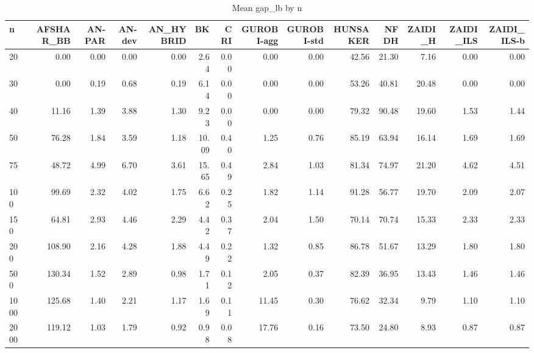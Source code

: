 \begin{table}[htbp]
\centering
\small
\caption{Mean gap\_lb by n}
\label{tab:E10a_state_of_the_art_b10_by_n}
\begin{tabular}{lrrrrrrrrrrrrr}
\toprule
n & AFSHAR\_BB & AN-PAR & AN-dev & AN\_HYBRID & BK & CRI & GUROBI-agg & GUROBI-std & HUNSAKER & NFDH & ZAIDI\_H & ZAIDI\_ILS & ZAIDI\_ILS-b \\
\midrule
20 & 0.00 & 0.00 & 0.00 & 0.00 & 2.64 & 0.00 & 0.00 & 0.00 & 42.56 & 21.30 & 7.16 & 0.00 & 0.00 \\
30 & 0.00 & 0.19 & 0.68 & 0.19 & 6.14 & 0.00 & 0.00 & 0.00 & 53.26 & 40.81 & 20.48 & 0.00 & 0.00 \\
40 & 11.16 & 1.39 & 3.88 & 1.30 & 9.23 & 0.00 & 0.00 & 0.00 & 79.32 & 90.48 & 19.60 & 1.53 & 1.44 \\
50 & 76.28 & 1.84 & 3.59 & 1.18 & 10.09 & 0.40 & 1.25 & 0.76 & 85.19 & 63.94 & 16.14 & 1.69 & 1.69 \\
75 & 48.72 & 4.99 & 6.70 & 3.61 & 15.65 & 0.49 & 2.84 & 1.03 & 81.34 & 74.97 & 21.20 & 4.62 & 4.51 \\
100 & 99.69 & 2.32 & 4.02 & 1.75 & 6.62 & 0.25 & 1.82 & 1.14 & 91.28 & 56.77 & 19.70 & 2.09 & 2.07 \\
150 & 64.81 & 2.93 & 4.46 & 2.29 & 4.42 & 0.37 & 2.04 & 1.50 & 70.14 & 70.74 & 15.33 & 2.33 & 2.33 \\
200 & 108.90 & 2.16 & 4.28 & 1.88 & 4.49 & 0.22 & 1.32 & 0.85 & 86.78 & 51.67 & 13.29 & 1.80 & 1.80 \\
500 & 130.34 & 1.52 & 2.89 & 0.98 & 1.71 & 0.12 & 2.05 & 0.37 & 82.39 & 36.95 & 13.43 & 1.46 & 1.46 \\
1000 & 125.68 & 1.40 & 2.21 & 1.17 & 1.69 & 0.11 & 11.45 & 0.30 & 76.62 & 32.34 & 9.79 & 1.10 & 1.10 \\
2000 & 119.12 & 1.03 & 1.79 & 0.92 & 0.98 & 0.08 & 17.76 & 0.16 & 73.50 & 24.80 & 8.93 & 0.87 & 0.87 \\
\bottomrule
\end{tabular}
\end{table}
